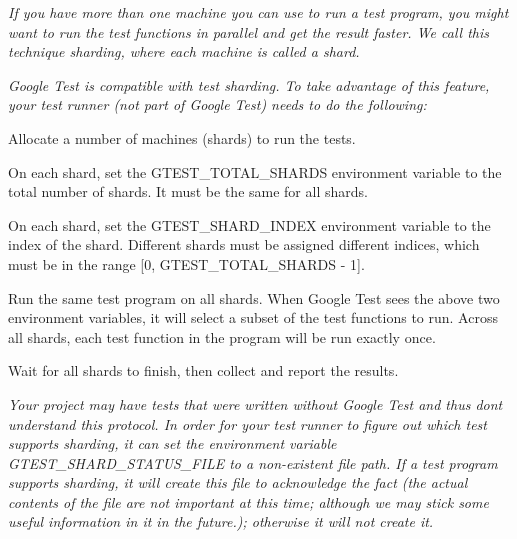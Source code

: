 {\itshape }

{\itshape If you have more than one machine you can use to run a test program, you might want to run the test functions in parallel and get the result faster. We call this technique {\itshape sharding}, where each machine is called a {\itshape shard}.}

{\itshape Google Test is compatible with test sharding. To take advantage of this feature, your test runner (not part of Google Test) needs to do the following\+:}

{\itshape 
\begin{DoxyEnumerate}
\item Allocate a number of machines (shards) to run the tests.
\end{DoxyEnumerate}
\begin{DoxyEnumerate}
\item On each shard, set the {\ttfamily G\+T\+E\+S\+T\+\_\+\+T\+O\+T\+A\+L\+\_\+\+S\+H\+A\+R\+DS} environment variable to the total number of shards. It must be the same for all shards.
\end{DoxyEnumerate}
\begin{DoxyEnumerate}
\item On each shard, set the {\ttfamily G\+T\+E\+S\+T\+\_\+\+S\+H\+A\+R\+D\+\_\+\+I\+N\+D\+EX} environment variable to the index of the shard. Different shards must be assigned different indices, which must be in the range {\ttfamily \mbox{[}0, G\+T\+E\+S\+T\+\_\+\+T\+O\+T\+A\+L\+\_\+\+S\+H\+A\+R\+DS -\/ 1\mbox{]}}.
\end{DoxyEnumerate}
\begin{DoxyEnumerate}
\item Run the same test program on all shards. When Google Test sees the above two environment variables, it will select a subset of the test functions to run. Across all shards, each test function in the program will be run exactly once.
\end{DoxyEnumerate}
\begin{DoxyEnumerate}
\item Wait for all shards to finish, then collect and report the results.
\end{DoxyEnumerate}}

{\itshape Your project may have tests that were written without Google Test and thus don\textquotesingle{}t understand this protocol. In order for your test runner to figure out which test supports sharding, it can set the environment variable {\ttfamily G\+T\+E\+S\+T\+\_\+\+S\+H\+A\+R\+D\+\_\+\+S\+T\+A\+T\+U\+S\+\_\+\+F\+I\+LE} to a non-\/existent file path. If a test program supports sharding, it will create this file to acknowledge the fact (the actual contents of the file are not important at this time; although we may stick some useful information in it in the future.); otherwise it will not create it.}

